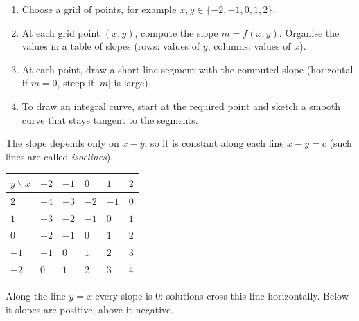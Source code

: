 \documentclass[11pt]{article}
\begin{document}
\begin{methode}
\begin{enumerate}
\item Choose a grid of points, for example $x, y \in \{-2, -1, 0, 1, 2\}$.
\item At each grid point $(x, y)$, compute the slope $m = f(x, y)$. Organise the values in a table of slopes (rows: values of $y$; columns: values of $x$).
\item At each point, draw a short line segment with the computed slope (horizontal if $m = 0$, steep if $|m|$ is large).
\item To draw an integral curve, start at the required point and sketch a smooth curve that stays tangent to the segments.
\end{enumerate}
\end{methode}

\begin{exemplebox}[Table of slopes for $\dfrac{dy}{dx} = x - y$]
The slope depends only on $x - y$, so it is constant along each line $x - y = c$ (such lines are called \emph{isoclines}).
\begin{center}
\begin{tabularx}{\linewidth}{|l|X|X|X|X|X|}
\hline
\rowcolor{popblueL} $y \backslash x$ & $-2$ & $-1$ & $0$ & $1$ & $2$ \\
\hline
$2$ & $-4$ & $-3$ & $-2$ & $-1$ & $0$ \\
\hline
$1$ & $-3$ & $-2$ & $-1$ & $0$ & $1$ \\
\hline
$0$ & $-2$ & $-1$ & $0$ & $1$ & $2$ \\
\hline
$-1$ & $-1$ & $0$ & $1$ & $2$ & $3$ \\
\hline
$-2$ & $0$ & $1$ & $2$ & $3$ & $4$ \\
\hline
\end{tabularx}
\end{center}
Along the line $y = x$ every slope is $0$: solutions cross this line horizontally. Below it slopes are positive, above it negative.
\end{exemplebox}
\end{document}
